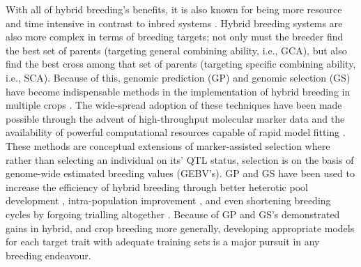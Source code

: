 \begin{refsection}
With all of hybrid breeding's benefits, it is also known for being more resource and time intensive in contrast to inbred systems \parencite{Labroo2021}. Hybrid breeding systems are also more complex in terms of breeding targets; not only must the breeder find the best set of parents (targeting general combining ability, i.e., GCA), but also find the best cross among that set of parents (targeting specific combining ability, i.e., SCA). Because of this, genomic prediction (GP) and genomic selection (GS) have become indispensable methods in the implementation of hybrid breeding in multiple crops \parencite{Zhao2015a, Labroo2021}. The wide-spread adoption of these techniques have been made possible through the advent of high-throughput molecular marker data and the availability of powerful computational resources capable of rapid model fitting \parencite{Meuwissen2001, Bernardo2016}. These methods are conceptual extensions of marker-assisted selection where rather than selecting an individual on its' QTL status, selection is on the basis of genome-wide estimated breeding values (GEBV's). GP and GS have been used to increase the efficiency of hybrid breeding through better heterotic pool development \parencite{Rembe2019}, intra-population improvement \parencite{Gaynor2017}, and even shortening breeding cycles by forgoing trialling altogether \parencite{Heffner2010}. Because of GP and GS's demonstrated gains in hybrid, and crop breeding more generally, developing appropriate models for each target trait with adequate training sets is a major pursuit in any breeding endeavour. 


\end{refsection}
